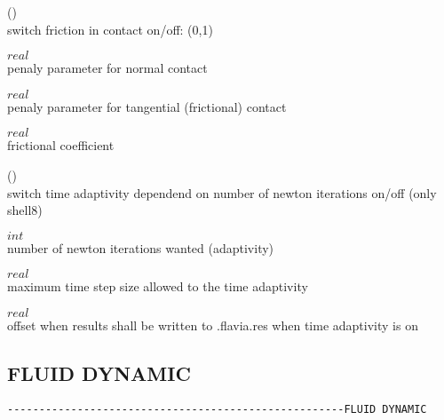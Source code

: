  (\kor{})\\
switch friction in contact on/off: (0,1)

 $real$\\
penaly parameter for normal contact

 $real$\\
penaly parameter for tangential (frictional) contact

 $real$\\
frictional coefficient

 (\kor{})\\
switch time adaptivity dependend on number of newton iterations on/off (only shell8)

 $int$\\
number of newton iterations wanted (adaptivity)

 $real$\\
maximum time step size allowed to the time adaptivity

 $real$\\
offset when results shall be written to .flavia.res when time adaptivity is on

\subsection{FLUID DYNAMIC}
\begin{verbatim}
-----------------------------------------------------FLUID DYNAMIC
\end{verbatim}









